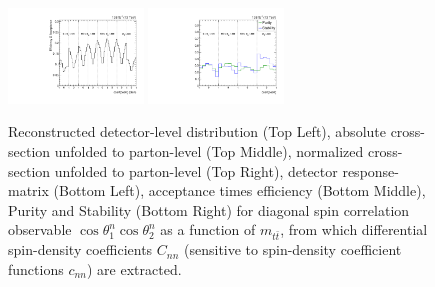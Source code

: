 \begin{figure}[htb]
\begin{center}
 \includegraphics[width=0.32\textwidth]{fig_fullRun2UL/unfolding/combined/TotEff_c_nn_mttbar.pdf}
 \includegraphics[width=0.32\textwidth]{fig_fullRun2UL/unfolding/combined/PurStab_c_nn_mttbar.pdf} \\
\caption{Reconstructed detector-level distribution (Top Left), absolute cross-section unfolded to parton-level (Top Middle), normalized cross-section unfolded to parton-level (Top Right), detector response-matrix (Bottom Left), acceptance times efficiency (Bottom Middle), Purity and Stability (Bottom Right) for diagonal spin correlation observable $\cos\theta_{1}^{n}\cos\theta_{2}^{n}$ as a function of $m_{t\bar{t}}$, from which differential spin-density coefficients $C_{nn}$ (sensitive to spin-density coefficient functions $c_{n n}$) are extracted.}
\label{fig:c_nn_mttbar}
\end{center}
\end{figure}
\clearpage
